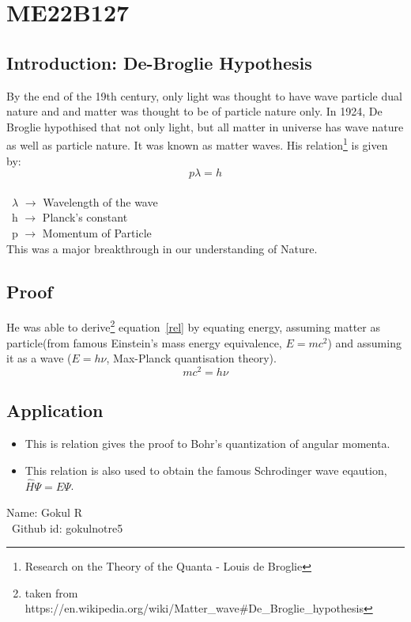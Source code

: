 \section{ME22B127}
\subsection{Introduction: De-Broglie Hypothesis}
By the end of the 19th century, only light was thought to have wave particle dual nature and and matter was thought to be of particle nature only. In 1924, De Broglie hypothised that not only light, but all matter in universe has wave nature as well as particle nature. It was known as matter waves. His relation\footnote{Research on the Theory of the Quanta - Louis de Broglie} is given by:
\begin{equation}
\label{rel}
        p\lambda= h
\end{equation}\\
 \ $\lambda$ $\rightarrow$ {Wavelength of the wave}\\
 \ h $\rightarrow$ Planck's constant\\
 \  p $\rightarrow$ Momentum of Particle\\
 This was a major breakthrough in our understanding of Nature.
  \subsection{Proof}
He was able to derive\footnote{ taken from https://en.wikipedia.org/wiki/Matter\_wave\#De\_Broglie\_hypothesis} equation~\ref{rel} by equating energy, assuming matter as particle(from famous Einstein's mass energy equivalence, $E=mc^2$) and assuming it as  a wave ($E={h \nu}$, Max-Planck quantisation theory).\begin{equation}
mc^2=h\nu
\end{equation}

\subsection{Application}
\begin{itemize}
\item This is relation gives the proof to Bohr's quantization of angular momenta. \item This relation is also used to obtain the famous Schrodinger wave eqaution, $\hat H \Psi=E\Psi$.
\end{itemize}
 Name: Gokul R \\
\ Github id: gokulnotre5 \\

